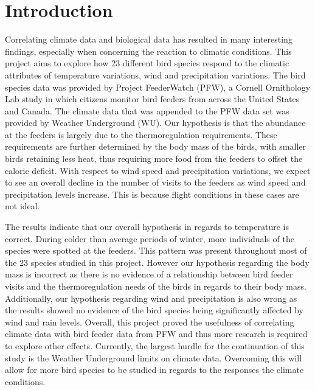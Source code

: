 \chapter{Introduction}

Correlating climate data and biological data has resulted in many interesting findings, especially when concerning the reaction to climatic conditions. This project aims to explore how 23 different bird species respond to the climatic attributes of temperature variations, wind and precipitation variations. The bird species data was provided by Project FeederWatch (PFW), a Cornell Ornithology Lab study in which citizens monitor bird feeders from across the United States and Canada. The climate data that was appended to the PFW data set was provided by Weather Underground (WU). Our hypothesis is that the abundance at the feeders is largely due to the thermoregulation requirements. These requirements are further determined by the body mass of the birds, with smaller birds retaining less heat, thus requiring more food from the feeders to offset the caloric deficit. With respect to wind speed and precipitation variations, we expect to see an overall decline in the number of visits to the feeders as wind speed and precipitation levels increase. This is because flight conditions in these cases are not ideal.

The results indicate that our overall hypothesis in regards to temperature is correct. During colder than average periods of winter, more individuals of the species were spotted at the feeders. This pattern was present throughout most of the 23 species studied in this project. However our hypothesis regarding the body mass is incorrect as there is no evidence of a relationship between bird feeder visits and the thermoregulation needs of the birds in regards to their body mass. Additionally, our hypothesis regarding wind and precipitation is also wrong as the results showed no evidence of the bird species being significantly affected by wind and rain levels. Overall, this project proved the usefulness of correlating climate data with bird feeder data from PFW and thus more research is required to explore other effects. Currently, the largest hurdle for the continuation of this study is the Weather Underground limits on climate data. Overcoming this will allow for more bird species to be studied in regards to the responses the climate conditions.   